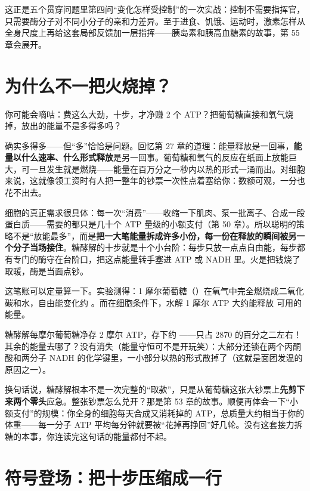 这正是五个贯穿问题里第四问“变化怎样受控制”的一次实战：控制不需要指挥官，只需要酶分子对不同小分子的亲和力差异。至于进食、饥饿、运动时，激素怎样从全身尺度上再给这套局部反馈加一层指挥——胰岛素和胰高血糖素的故事，第 55 章会展开。

\section{为什么不一把火烧掉？}

你可能会嘀咕：费这么大劲，十步，才净赚 2 个 ATP？把葡萄糖直接和氧气烧掉，放出的能量不是多得多吗？

确实多得多——但“多”恰恰是问题。回忆第 27 章的道理：能量释放是一回事，\textbf{能量以什么速率、什么形式释放}是另一回事。葡萄糖和氧气的反应在纸面上放能巨大，可一旦发生就是燃烧——能量在百万分之一秒内以热的形式一涌而出。对细胞来说，这就像领工资时有人把一整年的钞票一次性点着塞给你：数额可观，一分也花不出去。

细胞的真正需求很具体：每一次“消费”——收缩一下肌肉、泵一批离子、合成一段蛋白质——需要的都只是几十个 ATP 量级的小额支付（第 50 章）。所以聪明的策略不是“放能最多”，而是\textbf{把一大笔能量拆成许多小份，每一份在释放的瞬间被另一个分子当场接住}。糖酵解的十步就是十个小台阶：每步只放一点点自由能，每步都有专门的酶守在台阶口，把这点能量转手塞进 ATP 或 NADH 里。火是把钱烧了取暖，酶是当面点钞。

\begin{qiaoliang}
这笔账可以定量算一下。实验测得：1 摩尔葡萄糖（）在氧气中完全燃烧成二氧化碳和水，自由能变化约 。而在细胞条件下，水解 1 摩尔 ATP 大约能释放  可用的能量。

糖酵解每摩尔葡萄糖净存 2 摩尔 ATP，存下约 ——只占 2870 的百分之二左右！其余的能量去哪了？没有消失（能量守恒可不是开玩笑）：大部分还锁在两个丙酮酸和两分子 NADH 的化学键里，一小部分以热的形式散掉了（这就是面团发温的原因之一）。

换句话说，糖酵解根本不是一次完整的“取款”，只是从葡萄糖这张大钞票上\textbf{先剪下来两个零头}应急。整张钞票怎么兑开？那是第 53 章的故事。顺便再体会一下“小额支付”的规模：你全身的细胞每天合成又消耗掉的 ATP，总质量大约相当于你的体重——每一分子 ATP 平均每分钟就要被“花掉再挣回”好几轮。没有这套接力拆糖的本事，你连读完这句话的能量都付不起。
\end{qiaoliang}

\section{符号登场：把十步压缩成一行}

